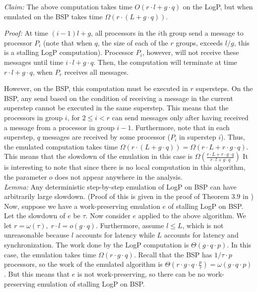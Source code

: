 \documentclass[12pt,a4paper]{article}
\begin{document}
\noindent \emph{Claim:} The above computation takes time $O(r \cdot l + g \cdot q)$ on the LogP, but when emulated on the BSP takes time 
$\Omega (r \cdot (L + g \cdot q)) $.

\noindent \emph{Proof:} At time $(i-1)l + g$, all processors in the $i$th group send a message to processor $P_i$ (note that when $q$, the size of
each of the $r$ groups, exceeds $l/g$, this is a stalling LogP computation). Processor $P_i$, however, will not receive these messages until time $i
\cdot l + g \cdot q$. Then, the computation will terminate at time $r \cdot l + g \cdot q$, when $P_r$ receives all messages. 

\noindent However, on the BSP, this computation must be executed in $r$ supersteps. On the BSP, any send based on the condition of receiving a
message in the current superstep cannot be executed in the same superstep. This means that the processors in group $i$, for $2 \leq i < r$ can send
messages only after having received a message from a processor in group $i-1$. Furthermore, note that in each superstep, $q$ messages are received
by some processor ($P_i$ in superstep $i$). Thus, the emulated computation takes time $\Omega(r \cdot (L + g \cdot q)) = \Omega(r \cdot L + r \cdot
g \cdot q)$. This means that the slowdown of the emulation in this case is $\Omega(\frac{r \cdot L + r \cdot g \cdot q}{r \cdot l + g \cdot q})$ It
is interesting to note that since there is no local computation in this algorithm, the parameter $o$ does not appear anywhere in the analysis. \\

\noindent \emph{Lemma:} Any deterministic step-by-step emulation of LogP on BSP can have arbitrarily large slowdown. (Proof of this is given in the
proof of Theorem $3.9$ in \cite{Vlr03}) \\

\noindent Now, suppose we have a work-preserving emulation $e$ of stalling LogP on BSP. Let the slowdown of $e$ be $\tau$. Now consider 
$e$ applied to the above algorithm. We let $r = \omega(\tau), \; r \cdot l = o(g \cdot q)$. Furthermore, assume $l \leq L$, which is not
unreasonable because $l$ accounts for latency while $L$ accounts for latency and synchronization.
The work done by the LogP computation is $\Theta(g \cdot q \cdot p)$.
In this case, the emulation takes time $\Omega(r \cdot g \cdot q)$. Recall that the BSP has $1/\tau \cdot p$ processors, so the work of the emulated
algorithm is $\Theta(r \cdot g \cdot q \cdot \frac{p}{\tau}) = \omega(g \cdot q \cdot p)$. But this means that $e$ is not work-preserving, so there
can be no work-preserving emulation of stalling LogP on BSP.
\end{document}
